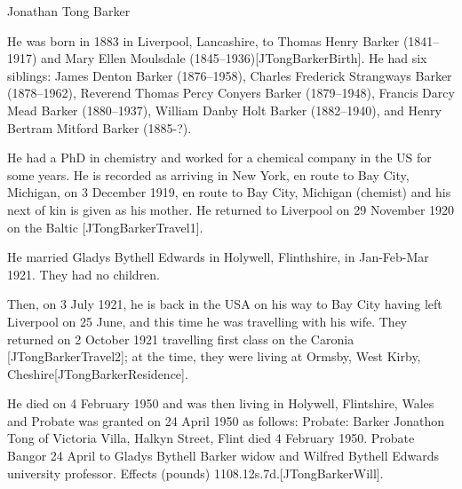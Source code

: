 
Jonathan Tong Barker


	He was born in 1883 in Liverpool, Lancashire, to Thomas Henry Barker (1841--1917) and Mary Ellen Moulsdale (1845--1936)[JTongBarkerBirth]. He had six siblings:  James Denton Barker (1876--1958), Charles Frederick Strangways Barker (1878--1962),  Reverend Thomas Percy Conyers Barker (1879--1948), Francis Darcy Mead Barker (1880--1937), William Danby Holt Barker (1882--1940), and Henry Bertram Mitford Barker (1885-?). 

He had a PhD in chemistry and worked for a chemical company in the US for some years. He is recorded as arriving in New York, en route to Bay City, Michigan, on 3 December 1919, en route to Bay City, Michigan (chemist) and his next of kin is given as his mother. He returned to Liverpool on 29 November 1920 on the Baltic [JTongBarkerTravel1]. 

He married Gladys Bythell Edwards in Holywell, Flinthshire, in Jan-Feb-Mar 1921. They had  no children.

 Then, on 3 July 1921, he is back in the USA on his way to Bay City having left Liverpool on 25 June, and this time he was travelling with his wife. They returned on 2 October 1921 travelling first class on the Caronia [JTongBarkerTravel2];  at the time,  they were living at Ormsby, West Kirby, Cheshire[JTongBarkerResidence]. 

He died on 4 February 1950 and was then living in Holywell, Flintshire, Wales and Probate was granted  on 24 April 1950 as follows:   Probate: Barker Jonathon Tong of Victoria Villa, Halkyn Street, Flint died 4 February 1950. Probate Bangor 24 April to Gladys Bythell Barker widow and Wilfred Bythell Edwards university professor. Effects (pounds) 1108.12s.7d.[JTongBarkerWill].


